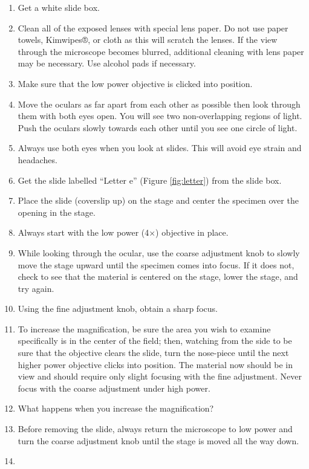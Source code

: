 \begin{enumerate}
\def\labelenumi{\arabic{enumi}.}
\tightlist
\item
  Get a white slide box.
\item
  Clean all of the exposed lenses with special lens paper. Do not use paper towels, Kimwipes®, or cloth as this will scratch the lenses. If the view through the microscope becomes blurred, additional cleaning with lens paper may be necessary. Use alcohol pads if necessary.
\item
  Make sure that the low power objective is clicked into position.
\item
  Move the oculars as far apart from each other as possible then look through them with
  both eyes open. You will see two non-overlapping regions of light. Push the oculars slowly towards each other until you see one circle of light.
\item
  Always use both eyes when you look at slides. This will avoid eye strain and headaches.
\item
  Get the slide labelled ``Letter e'' (Figure \ref{fig:letter}) from the slide box.
\item
  Place the slide (coverslip up) on the stage and center the specimen over the opening in the stage.
\item
  Always start with the low power (4×) objective in place.
\item
  While looking through the ocular, use the coarse adjustment knob to slowly move the stage upward until the specimen comes into focus. If it does not, check to see that the material is centered on the stage, lower the stage, and try again.
\item
  Using the fine adjustment knob, obtain a sharp focus.
\item
  To increase the magnification, be sure the area you wish to examine specifically is in the center of the field; then, watching from the side to be sure that the objective clears the slide, turn the nose-piece until the next higher power objective clicks into position. The material now should be in view and should require only slight focusing with the fine adjustment. Never focus with the coarse adjustment under high power.
\item
  What happens when you increase the magnification?
\item
  Before removing the slide, always return the microscope to low power and turn the coarse adjustment knob until the stage is moved all the way down.
\item

\end{enumerate}
